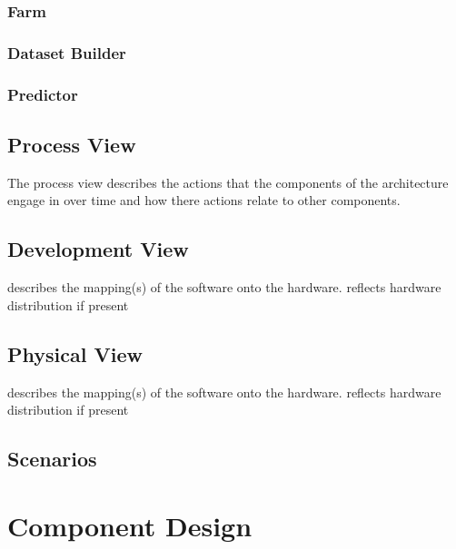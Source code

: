 \subsubsection{Farm}


\subsubsection{Dataset Builder}

\subsubsection{Predictor}


\subsection{Process View}
The process view describes the actions that the components of the architecture engage in over time and how there actions relate to other components.

\subsection{Development View}
describes the mapping(s) of the software onto the hardware. reflects hardware distribution if present

\subsection{Physical View}
describes the mapping(s) of the software onto the hardware. reflects hardware distribution if present

\subsection{Scenarios}

\section{Component Design}



